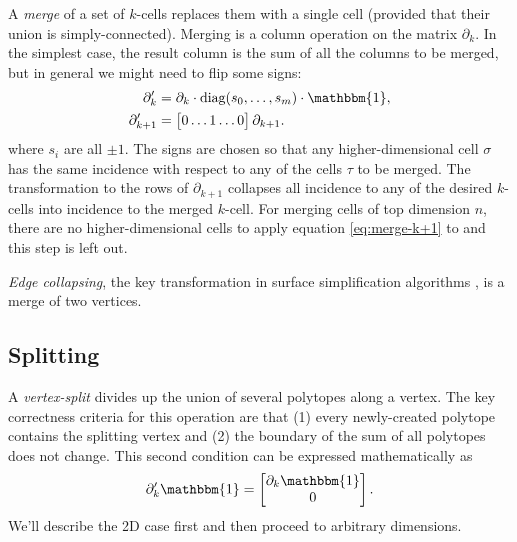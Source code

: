 \documentclass[twocolumn]{article}
\begin{document}
A \emph{merge} of a set of $k$-cells replaces them with a single cell (provided that their union is simply-connected).
Merging is a column operation on the matrix $\partial_k$.
In the simplest case, the result column is the sum of all the columns to be merged, but in general we might need to flip some signs:
\begin{align}
    \partial_k' & = \partial_k\cdot\text{diag}(s_0, \ldots, s_m)\cdot\mathbbm{1}, \\
    \partial_{k + 1}' & = \left[\begin{matrix} 0 \ldots 1 \ldots 0\end{matrix}\right]\partial_{k + 1}. \label{eq:merge-k+1}
\end{align}
where $s_i$ are all $\pm 1$.
The signs are chosen so that any higher-dimensional cell $\sigma$ has the same incidence with respect to any of the cells $\tau$ to be merged.
The transformation to the rows of $\partial_{k + 1}$ collapses all incidence to any of the desired $k$-cells into incidence to the merged $k$-cell.
For merging cells of top dimension $n$, there are no higher-dimensional cells to apply equation \eqref{eq:merge-k+1} to and this step is left out.

\emph{Edge collapsing}, the key transformation in surface simplification algorithms \cite{gueziec1995surface}, is a merge of two vertices.


\subsection{Splitting}

A \emph{vertex-split} divides up the union of several polytopes along a vertex.
The key correctness criteria for this operation are that (1) every newly-created polytope contains the splitting vertex and (2) the boundary of the sum of all polytopes does not change.
This second condition can be expressed mathematically as
\begin{equation}
    \partial_k'\mathbbm{1} = \left[\begin{matrix}\partial_k\mathbbm{1} \\ 0\end{matrix}\right].
    \label{eq:split-preserves-boundaries}
\end{equation}
We'll describe the 2D case first and then proceed to arbitrary dimensions.
\end{document}
